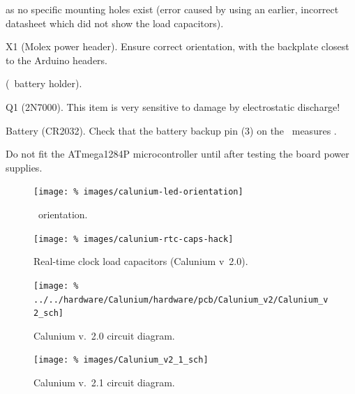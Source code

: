 \begin{buildorder}
  as no specific mounting holes exist (error caused by using an
  earlier, incorrect datasheet which did not show the load
  capacitors).
\item X1 (Molex power header). Ensure correct orientation, with the
  backplate closest to the Arduino headers.
\item {} (\rtc\ battery holder).
\item Q1 (2N7000). This item is very sensitive to damage by
  electrostatic discharge!
\item Battery (CR2032). Check that the battery backup pin (3) on the
  \rtc\ measures .
\item {}
\end{buildorder}
Do not fit the ATmega1284P microcontroller until after testing the
board power supplies.

\begin{figure}
  \centering
  \texttt{[image: \%
    images/calunium-led-orientation]}
  \caption[LED orientation]{\led\ orientation. }
  \label{fig:calunium-led-orientation}
\end{figure}
\begin{figure}
  \centering
  \texttt{[image: \%
    images/calunium-rtc-caps-hack]}
  \caption[Real-time clock load capacitors (Calunium v~2.0)]{%
    Real-time clock load capacitors (Calunium v~2.0). }
  \label{fig:calunium-rtc-caps-hack}
\end{figure}


\begin{landscape}
  \begin{figure}[p]
    \centering
    \texttt{[image: \%
      ../../hardware/Calunium/hardware/pcb/Calunium\_v2/Calunium\_v2\_sch]}  
    \caption{Calunium v.~2.0 circuit diagram.}
    \label{fig:calunium-v2.0-cct-diag}
  \end{figure}
  \begin{figure}[p]
    \centering
    \texttt{[image: \%
      images/Calunium\_v2\_1\_sch]}
    \caption{Calunium v.~2.1 circuit diagram.}
    \label{fig:calunium-v2.1-cct-diag}
  \end{figure}
\end{landscape}

